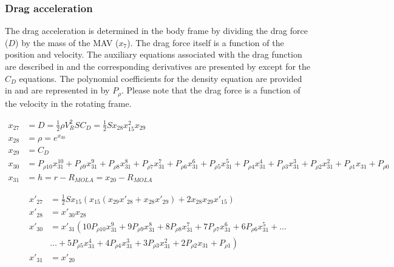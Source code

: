  \subsubsection{Drag acceleration}
 \label{subsubsec:tsiDrag}
The drag acceleration is determined in the body frame by dividing the drag force ($D$) by the mass of the \ac{MAV} ($x_{7}$). The drag force itself is a function of the position and velocity. The auxiliary equations associated with the drag function are described in  and the corresponding derivatives are presented by  except for the $C_{D}$ equations. The polynomial coefficients for the density equation are provided in  and are represented in  by $P_{\rho}$. Please note that the drag force is a function of the velocity in the rotating frame.

 \begin{equation} \label{eq:dragAux}
\begin{split}
x_{27} &= D = \frac{1}{2}\rho V_{R}^{2}SC_{D} = \frac{1}{2}S x_{28}x_{15}^{2}x_{29} \\
x_{28} &= \rho = e^{x_{30}} \\
x_{29} &= C_{D} \\
x_{30} &= P_{\rho 10}x_{31}^{10}+P_{\rho 9}x_{31}^{9}+P_{\rho 8}x_{31}^{8}+P_{\rho 7}x_{31}^{7}+P_{\rho 6}x_{31}^{6}+P_{\rho 5}x_{31}^{5}+P_{\rho 4}x_{31}^{4}+P_{\rho 3}x_{31}^{3}+P_{\rho 2}x_{31}^{2}+P_{\rho 1}x_{31}+P_{\rho 0} \\
x_{31} &= h = r-R_{MOLA} = x_{20}-R_{MOLA}
\end{split}
\end{equation}

 \begin{equation} \label{eq:dragDerAux}
\begin{split}
x'_{27} &= \frac{1}{2}Sx_{15}\left(x_{15} \left(x_{29}x'_{28}+x_{28}x'_{29}\right)+2x_{28}x_{29}x'_{15}\right) \\
x'_{28} &= x'_{30}x_{28} \\
x'_{30} &=x'_{31} \left(10 P_{\rho 10}x_{31}^{9}+9 P_{\rho 9}x_{31}^{8}+8 P_{\rho 8}x_{31}^{7}+7 P_{\rho 7}x_{31}^{6}+6 P_{\rho 6}x_{31}^{5}+\dots \right. \\
&  \left. \dotsc +5 P_{\rho 5}x_{31}^{4}+4 P_{\rho 4}x_{31}^{3}+3 P_{\rho 3}x_{31}^{2}+2 P_{\rho 2}x_{31}+P_{\rho 1}\right) \\
x'_{31} &= x'_{20}
\end{split}
\end{equation}

